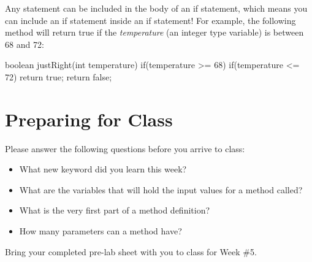 Any statement can be included in the body of an if statement, which means you can include an if statement inside an if statement! For example, the following method will return true if the \textit{temperature} (an integer type variable) is between 68 and 72:

\begin{code}

boolean justRight(int temperature) {
	if(temperature >= 68) {
		if(temperature <= 72) {
			return true;
		}
	}
	return false;
}

\end{code}


\newpage

\section{Preparing for Class}

Please answer the following questions before you arrive to class:

\begin{exer}

\begin{itemize}
  
\item What new keyword did you learn this week? 

  \evalline
  
\item What are the variables that will hold the input values for a method called?

  \evalline
  
\item What is the very first part of a method definition? 

  \evalline
  
\item How many parameters can a method have?

  \evalline
  
  
\end{itemize}

\end{exer}

Bring your completed pre-lab sheet with you to class for Week \#5. 

